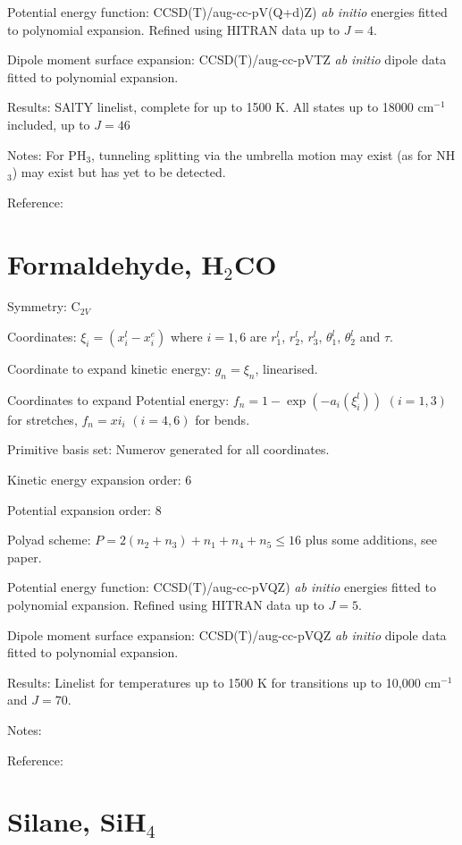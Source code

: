 Potential energy function:  CCSD(T)/aug-cc-pV(Q+d)Z) \textit{ab initio} energies fitted to polynomial expansion. 
Refined using HITRAN data up to $J = 4$.

Dipole moment surface expansion: CCSD(T)/aug-cc-pVTZ \textit{ab initio} dipole data fitted to polynomial expansion.


Results: SAlTY linelist, complete for up to 1500 K. All states up to 18000 cm$^{-1}$ included, up to $J = 46$

Notes: For PH$_3$, tunneling splitting via the umbrella motion may exist (as for NH$_3$) may exist \cite{jt658} but has
yet to be detected. 

Reference: \cite{jt556,jt592}



\section{Formaldehyde, H$_2$CO}

Symmetry: C$_{2V}$

Coordinates: $\xi_i = (x_i^l - x_i^e)$ where $i = 1, 6$ are $r_1^l$, $r_2^l$, $r_3^l$, $\theta_1^l$, $\theta_2^l$ and $\tau$.

Coordinate to expand kinetic energy: $g_n = \xi_n$, linearised.

Coordinates to expand Potential energy: $f_n = 1 - \exp(-a_i(\xi_i^l))$ $(i = 1, 3)$ for stretches, $f_n = xi_i$ $(i = 4, 6)$
for bends.

Primitive basis set: Numerov generated for all coordinates.

Kinetic energy expansion order: 6

Potential expansion order: 8

Polyad scheme: $P = 2(n_2 + n_3) + n_1 + n_4 + n_5 \leq 16$ plus some additions, see paper.

Potential energy function:  CCSD(T)/aug-cc-pVQZ) \textit{ab initio} energies fitted to polynomial expansion. 
Refined using HITRAN data up to $J = 5$.

Dipole moment surface expansion: CCSD(T)/aug-cc-pVQZ \textit{ab initio} dipole data fitted to polynomial expansion.

Results: Linelist for temperatures up to 1500 K for transitions up to 10,000 cm$^{-1}$ and $J = 70$.

Notes: 

Reference: \cite{jt597}


\section{Silane, SiH$_4$}

